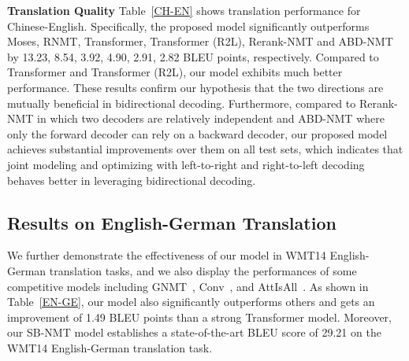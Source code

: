 \documentclass[11pt,a4paper]{article}
\begin{document}
\begin{CJK*}{UTF8}{gbsn}
\textbf{Translation Quality}
Table~\ref{CH-EN} shows translation performance for Chinese-English.
Specifically, the proposed model significantly outperforms Moses, RNMT, Transformer, Transformer (R2L), Rerank-NMT and ABD-NMT by 13.23, 8.54, 3.92, 4.90, 2.91, 2.82 BLEU points, respectively.
Compared to Transformer and Transformer (R2L), our model exhibits much better performance. These results confirm our hypothesis that the two directions are mutually beneficial in bidirectional decoding. Furthermore, compared to Rerank-NMT in which two decoders are relatively independent and ABD-NMT where only the forward decoder can rely on a backward decoder, our proposed model achieves substantial improvements over them on all test sets, which indicates that joint modeling and optimizing with left-to-right and right-to-left decoding behaves better in leveraging bidirectional decoding.

\subsection{Results on English-German Translation}

We further demonstrate the effectiveness of our model in WMT14 English-German translation tasks, and we also display the performances of some competitive models including GNMT~\cite{Wu:2016}, Conv~\cite{gehring2017convolutional}, and AttIsAll~\cite{vaswani2017attention}.
As shown in Table~\ref{EN-GE}, our model also significantly outperforms others and gets an improvement of 1.49 BLEU points than a strong Transformer model. 
Moreover, our SB-NMT model establishes a state-of-the-art BLEU score of 29.21 on the WMT14 English-German translation task.


\end{CJK*}
\end{document}
